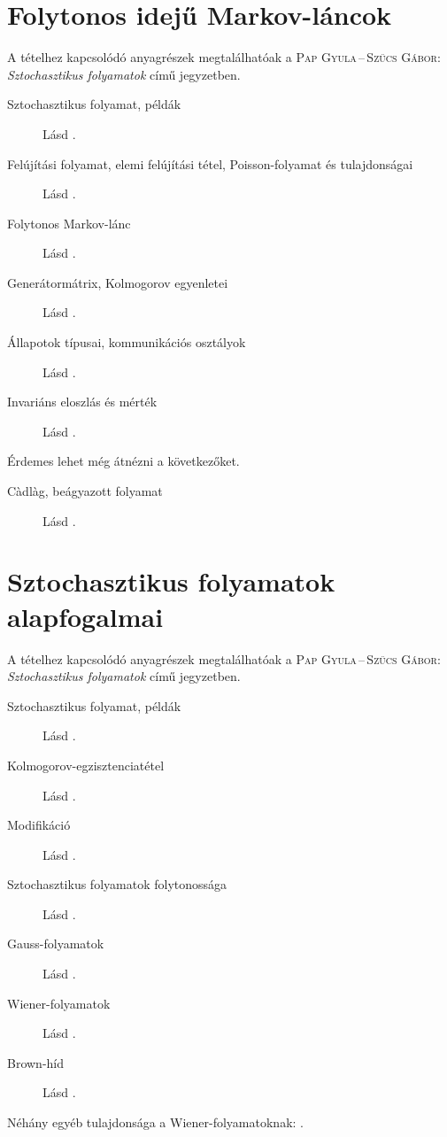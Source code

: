 \documentclass[DIV=15,appendixprefix]{scrreprt}
\theoremstyle{definition}
\theoremstyle{remark}
\begin{document}
\section{Folytonos idejű Markov-láncok}
A tételhez kapcsolódó anyagrészek megtalálhatóak a \textsc{Pap Gyula\,--\,Szűcs Gábor}:
\emph{Sztochasztikus folyamatok} \cite{PapSzucs} című jegyzetben.
%
\begin{description}
	\item[Sztochasztikus folyamat, példák] Lásd \cite[3--4.~oldal]{PapSzucs}.
	\item[Felújítási folyamat, elemi felújítási tétel, Poisson-folyamat és tulajdonságai] Lásd
		\cite[74--77.~oldal]{PapSzucs}.
	\item[Folytonos Markov-lánc] Lásd \cite[83--85.~oldal]{PapSzucs}.
	\item[Generátormátrix, Kolmogorov egyenletei] Lásd \cite[86--90.~oldal]{PapSzucs}.
	\item[Állapotok típusai, kommunikációs osztályok] Lásd
		\cite[100--102.~oldal]{PapSzucs}.
	\item[Invariáns eloszlás és mérték] Lásd \cite[103--106.~oldal]{PapSzucs}.
\end{description}
Érdemes lehet még átnézni a következőket.
\begin{description}
	\item[C\`adl\`ag, beágyazott folyamat] Lásd \cite[93--95.~oldal]{PapSzucs}.
\end{description}
%
\section{Sztochasztikus folyamatok alapfogalmai}
A tételhez kapcsolódó anyagrészek megtalálhatóak a \textsc{Pap Gyula\,--\,Szűcs Gábor}:
\emph{Sztochasztikus folyamatok} \cite{PapSzucs} című jegyzetben.
%
\begin{description}
	\item[Sztochasztikus folyamat, példák] Lásd \cite[3--4.~oldal]{PapSzucs}.
	\item[Kolmogorov-egzisztenciatétel] Lásd \cite[110--111.~oldal]{PapSzucs}.
	\item[Modifikáció] Lásd \cite[111--113.~oldal]{PapSzucs}.
	\item[Sztochasztikus folyamatok folytonossága] Lásd \cite[116.~oldal]{PapSzucs}.
	\item[Gauss-folyamatok] Lásd \cite[122--123.~oldal]{PapSzucs}.
	\item[Wiener-folyamatok] Lásd \cite[124--125.~oldal]{PapSzucs}.
	\item[Brown-híd] Lásd \cite[126.~oldal]{PapSzucs}.
\end{description}
Néhány egyéb tulajdonsága a Wiener-folyamatoknak: \cite[106--111.~dia]{Szucs}.
%
\end{document}
